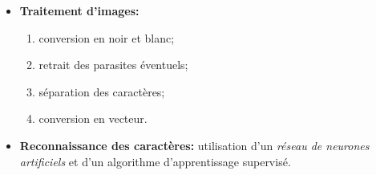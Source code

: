 \clearpage
\pagestyle{fancy}

\begin{slide}

\begin{itemize}

	\item \textbf{Traitement d'images:}
	\begin{enumerate}
		\item conversion en noir et blanc;
		\item retrait des parasites éventuels;
		\item séparation des caractères; 
		\item conversion en vecteur.
	\end{enumerate}

	\item \textbf{Reconnaissance des caractères:} utilisation d'un \textit{réseau de neurones artificiels} et d'un algorithme d'apprentissage supervisé.

\end{itemize}
	
\end{slide}